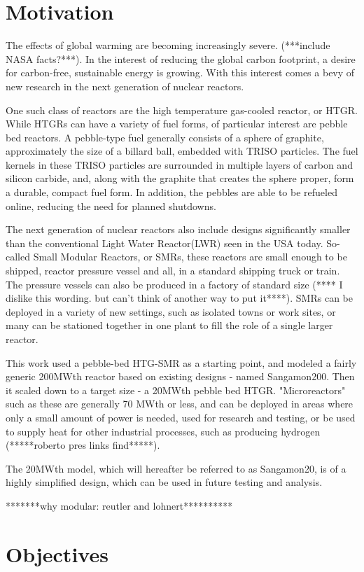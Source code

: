 

\section{Motivation}

The effects of global warming are becoming increasingly severe. (***include NASA facts?***).  In the interest of reducing the global carbon footprint, a desire for carbon-free, sustainable energy is growing. With this interest comes a bevy of new research in the next generation of nuclear reactors.

One such class of reactors are the high temperature gas-cooled reactor, or HTGR.  While HTGRs can have a variety of fuel forms, of particular interest are pebble bed reactors.  A pebble-type fuel generally consists of a sphere of graphite, approximately the size of a billard ball, embedded with TRISO particles.  The fuel kernels in these TRISO particles are surrounded in multiple layers of carbon and silicon carbide, and, along with the graphite that creates the sphere proper, form a durable, compact fuel form.  In addition, the pebbles are able to be refueled online, reducing the need for planned shutdowns.

The next generation of nuclear reactors also include designs significantly smaller than the conventional Light Water Reactor(LWR) seen in the USA today.  So-called Small Modular Reactors, or SMRs, these reactors are small enough to be shipped, reactor pressure vessel and all, in a standard shipping truck or train.  The pressure vessels can also be produced in a factory of standard size (**** I dislike this wording. but can't think of another way to put it****).  SMRs can be deployed in a variety of new settings, such as isolated towns or work sites, or many can be stationed together in one plant to fill the role of a single larger reactor.

This work used a pebble-bed HTG-SMR as a starting point, and modeled a fairly generic 200MWth reactor based on existing designs - named Sangamon200. Then it scaled down to a target size - a 20MWth pebble bed HTGR.  "Microreactors" such as these are generally 70 MWth or less, and can be deployed in areas where only a small amount of power is needed, used for research and testing, or be used to supply heat for other industrial processes, such as producing hydrogen (*****roberto pres links find*****).

The 20MWth model, which will hereafter be referred to as Sangamon20, is of a highly simplified design, which can be used in future testing and analysis.

*******why modular: reutler and lohnert**********

\section{Objectives}

